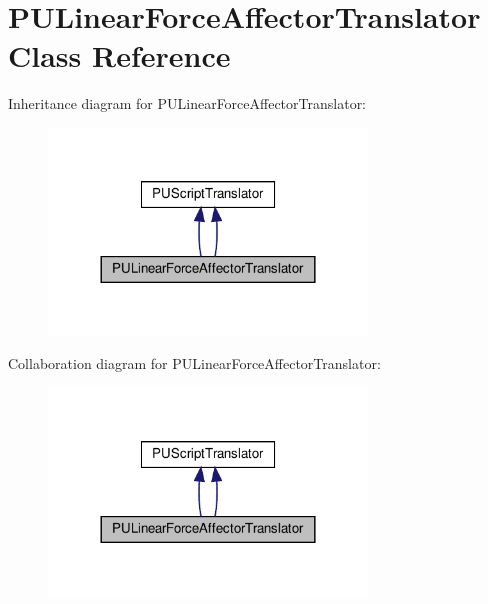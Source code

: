 \hypertarget{classPULinearForceAffectorTranslator}{}\section{P\+U\+Linear\+Force\+Affector\+Translator Class Reference}
\label{classPULinearForceAffectorTranslator}


Inheritance diagram for P\+U\+Linear\+Force\+Affector\+Translator\+:
\nopagebreak
\begin{figure}[H]
\begin{center}
\leavevmode
\includegraphics[width=240pt]{classPULinearForceAffectorTranslator__inherit__graph}
\end{center}
\end{figure}


Collaboration diagram for P\+U\+Linear\+Force\+Affector\+Translator\+:
\nopagebreak
\begin{figure}[H]
\begin{center}
\leavevmode
\includegraphics[width=240pt]{classPULinearForceAffectorTranslator__coll__graph}
\end{center}
\end{figure}
